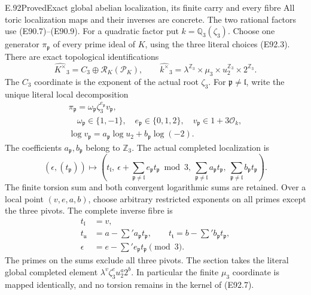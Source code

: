 \begin{statement}{E.92}{Proved}{Exact global abelian localization, its finite carry and every fibre}
All toric localization maps and their inverses are
concrete. The two rational factors use (E90.7)--(E90.9).
For a quadratic factor put $k=\mathbb Q_3(\zeta_3)$.
Choose one generator $\pi_{\mathfrak p}$ of every
prime ideal of $K$, using the three literal choices
(E92.3). There are exact topological identifications
\[
 \widehat{K^\times}_3=C_3\oplus\mathscr R_K(\mathcal P_K),
 \qquad
 \widehat{k^\times}_3
  =\lambda^{\mathbb Z_3}\times\mu_3
                      \times u_2^{\mathbb Z_3}\times2^{\mathbb Z_3}.
 \tag{E92.5}
\]
The $C_3$ coordinate is the exponent of the actual
root $\zeta_3$. For $\mathfrak p\ne\mathfrak l$, write
the unique literal local decomposition
\[
 \begin{gathered}
 \pi_{\mathfrak p}
   =\omega_{\mathfrak p}\zeta_3^{e_{\mathfrak p}}v_{\mathfrak p},\\
 \quad\omega_{\mathfrak p}\in\{1,-1\},\quad
 e_{\mathfrak p}\in\{0,1,2\},\quad v_{\mathfrak p}\in1+3\mathcal O_k,
 \\
 \log v_{\mathfrak p}
  =a_{\mathfrak p}\log u_2+b_{\mathfrak p}\log(-2).
 \end{gathered}
 \tag{E92.6}
\]
The coefficients $a_{\mathfrak p},b_{\mathfrak p}$ belong
to $\mathbb Z_3$. The actual completed localization is
\[
 (\epsilon,(t_{\mathfrak p}))\longmapsto
 \left(t_{\mathfrak l},\
  \epsilon+\sum_{\mathfrak p\ne\mathfrak l}e_{\mathfrak p}t_{\mathfrak p}\bmod3,\
  \sum_{\mathfrak p\ne\mathfrak l}a_{\mathfrak p}t_{\mathfrak p},\
  \sum_{\mathfrak p\ne\mathfrak l}b_{\mathfrak p}t_{\mathfrak p}\right).
 \tag{E92.7}
\]
The finite torsion sum and both convergent logarithmic
sums are retained. Over a local point $(v,e,a,b)$,
choose arbitrary restricted exponents on all primes
except the three pivots. The complete inverse fibre is
\[
\begin{aligned}
 t_{\mathfrak l}&=v,\\
 t_{\mathfrak u}&=a-\sum{}'a_{\mathfrak p}t_{\mathfrak p},\qquad
 t_{\mathfrak t}=b-\sum{}'b_{\mathfrak p}t_{\mathfrak p},\\
 \epsilon&=e-\sum{}'e_{\mathfrak p}t_{\mathfrak p}\pmod3.
\end{aligned}
 \tag{E92.8}
\]
The primes on the sums exclude all three pivots.
The section takes the literal global completed
element $\lambda^v\zeta_3^e u_2^a2^b$.
In particular the finite $\mu_3$ coordinate is
mapped identically, and no torsion remains in
the kernel of (E92.7).


\end{statement}
